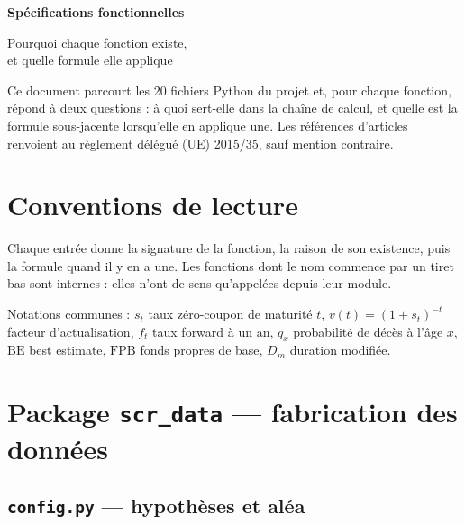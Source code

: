 \documentclass[10pt,a4paper]{article}
\begin{document}
\begin{titlepage}
\centering
\vspace*{3.5cm}
{\color{bleufonce}\Huge\bfseries Spécifications fonctionnelles\par}
\vspace{0.7cm}
{\LARGE Pourquoi chaque fonction existe,\\[4pt] et quelle formule elle applique\par}
\vspace{2.5cm}
\begin{minipage}{0.8\linewidth}\small
Ce document parcourt les 20 fichiers Python du projet et, pour chaque fonction, répond à deux
questions : à quoi sert-elle dans la chaîne de calcul, et quelle est la formule sous-jacente
lorsqu'elle en applique une. Les références d'articles renvoient au règlement délégué (UE)
2015/35, sauf mention contraire.
\end{minipage}
\vfill
\end{titlepage}

\tableofcontents
\newpage

\section{Conventions de lecture}

Chaque entrée donne la signature de la fonction, la raison de son existence, puis la formule
quand il y en a une. Les fonctions dont le nom commence par un tiret bas sont internes : elles
n'ont de sens qu'appelées depuis leur module.

Notations communes : $s_t$ taux zéro-coupon de maturité $t$, $v(t) = (1+s_t)^{-t}$ facteur
d'actualisation, $f_t$ taux forward à un an, $q_x$ probabilité de décès à l'âge $x$,
$\mathrm{BE}$ best estimate, $\mathrm{FPB}$ fonds propres de base, $D_m$ duration modifiée.

\section{Package \texttt{scr\_data} — fabrication des données}

\subsection{\texttt{config.py} — hypothèses et aléa}
\end{document}
